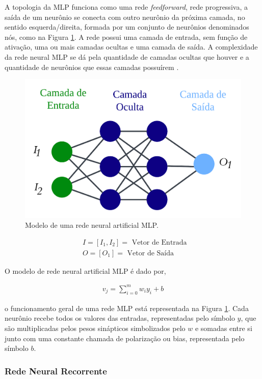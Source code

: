  A topologia da MLP funciona como uma rede \textit{feedforward}, rede progressiva, a saída de um neurônio se conecta com outro neurônio da próxima camada, no sentido esquerda/direita, formada por um conjunto de neurônios denominados nós, como  na Figura \ref{fig:ann}. A rede possui uma camada de entrada, sem função de ativação, uma ou mais camadas ocultas e uma camada de saída. A complexidade da rede neural MLP se dá pela quantidade de camadas ocultas que houver e a quantidade de neurônios que essas camadas possuírem \cite{Grubler2018}.
 
 \begin{figure}[!htb]
 	\centering
 	\caption{Modelo de uma rede neural artificial MLP.}
 	\includegraphics[width=0.5\linewidth]{Modelos/Figuras/ann.pdf}
 	
 	\label{fig:ann}
  \end{figure}
 
 \begin{equation}
 	\begin{aligned}
 		& I=\left[I_1, I_2\right]=\text { Vetor de Entrada } \\
 		& O=\left[O_1\right]=\text { Vetor de Saída }
 	\end{aligned} \nonumber
 \end{equation}
 
 O modelo de rede neural artificial MLP é dado por,
 
 \begin{eqnarray}
 	v_j=\sum_{i=0}^m w_i y_i+b\label{eq:ann}
 \end{eqnarray}
 
 \noindent o funcionamento geral de uma rede MLP está representada na Figura \ref{fig:ann}. Cada neurônio recebe todos os valores das entradas, representadas pelo símbolo $y$, que são multiplicadas pelos pesos sinápticos simbolizados pelo $w$ e somadas entre si junto com uma constante chamada de polarização ou bias, representada pelo símbolo $b$.
 
  \subsubsection{Rede Neural Recorrente}
  
